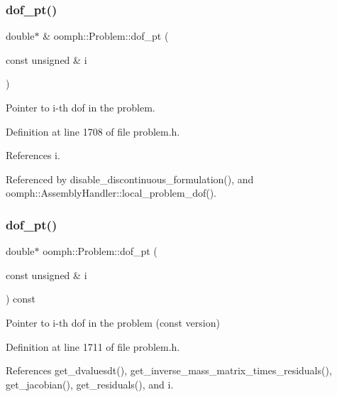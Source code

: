 \subsubsection{\texorpdfstring{dof\+\_\+pt()}{dof\_pt()}\hspace{0.1cm}{\footnotesize\ttfamily [1/2]}}
{\footnotesize\ttfamily double$\ast$ \& oomph\+::\+Problem\+::dof\+\_\+pt (\begin{DoxyParamCaption}\item[{const unsigned \&}]{i }\end{DoxyParamCaption})\hspace{0.3cm}{\ttfamily [inline]}}



Pointer to i-\/th dof in the problem. 



Definition at line 1708 of file problem.\+h.



References i.



Referenced by disable\+\_\+discontinuous\+\_\+formulation(), and oomph\+::\+Assembly\+Handler\+::local\+\_\+problem\+\_\+dof().

\mbox{\label{classoomph_1_1Problem_acf51914cb75a640f82b269493311c187}} 
\subsubsection{\texorpdfstring{dof\+\_\+pt()}{dof\_pt()}\hspace{0.1cm}{\footnotesize\ttfamily [2/2]}}
{\footnotesize\ttfamily double$\ast$ oomph\+::\+Problem\+::dof\+\_\+pt (\begin{DoxyParamCaption}\item[{const unsigned \&}]{i }\end{DoxyParamCaption}) const\hspace{0.3cm}{\ttfamily [inline]}}



Pointer to i-\/th dof in the problem (const version) 



Definition at line 1711 of file problem.\+h.



References get\+\_\+dvaluesdt(), get\+\_\+inverse\+\_\+mass\+\_\+matrix\+\_\+times\+\_\+residuals(), get\+\_\+jacobian(), get\+\_\+residuals(), and i.

